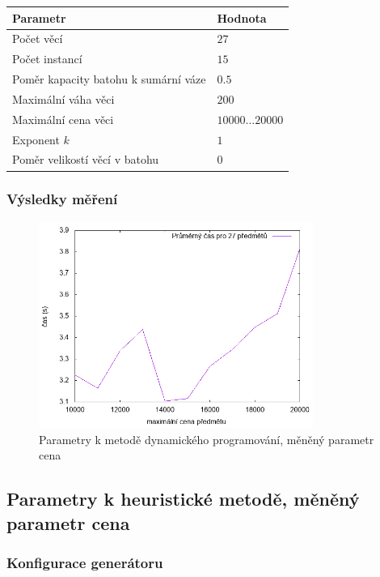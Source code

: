 \documentclass{article}
\begin{document}
\begin{table}[H]
\centering
    \begin{tabular}{ |l|l| } 
        \hline
        Parametr & Hodnota \\
        \hline
        \hline
        Počet věcí & $27$ \\
        Počet instancí & $15$ \\
        Poměr kapacity batohu k sumární váze & $0.5$ \\
        Maximální váha věci & $200$ \\
        Maximální cena věci & $10000 \dots 20000$ \\
        Exponent $k$ & $1$ \\
        Poměr velikostí věcí v batohu & $0$ \\
        \hline
    \end{tabular}
\end{table}

\subsubsection*{Výsledky měření}

\begin{figure}[H]
    \centering
    \includegraphics[width=0.8\textwidth]{inputs-dp-price/inputs-dp-price.png}
    \caption{Parametry k metodě dynamického programování, měněný parametr cena}
    \label{fig:g3}
\end{figure}

\subsection{Parametry k heuristické metodě, měněný parametr cena}

\subsubsection*{Konfigurace generátoru}
\end{document}
